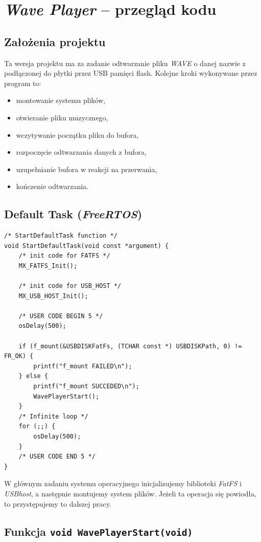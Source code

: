 \documentclass[12pt,a4paper]{article}
\begin{document}
\section{\emph{Wave Player} -- przegląd kodu}

\subsection{Założenia projektu}
Ta wersja projektu ma za zadanie odtwarzanie pliku \emph{WAVE} o danej nazwie z podłączonej do płytki przez USB pamięci flash. Kolejne kroki wykonywane przez program to:
\begin{itemize}
 \item montowanie systemu plików,
 \item otwieranie pliku muzycznego,
 \item wczytywanie początku pliku do bufora,
 \item rozpoczęcie odtwarzania danych z bufora,
 \item uzupełnianie bufora w reakcji na przerwania,
 \item kończenie odtwarzania.
\end{itemize}

\subsection{Default Task (\emph{FreeRTOS})}

\begin{lstlisting}
/* StartDefaultTask function */
void StartDefaultTask(void const *argument) {
    /* init code for FATFS */
    MX_FATFS_Init();

    /* init code for USB_HOST */
    MX_USB_HOST_Init();

    /* USER CODE BEGIN 5 */
    osDelay(500);

    if (f_mount(&USBDISKFatFs, (TCHAR const *) USBDISKPath, 0) != FR_OK) {
        printf("f_mount FAILED\n");
    } else {
        printf("f_mount SUCCEDED\n");
        WavePlayerStart();
    }
    /* Infinite loop */
    for (;;) {
        osDelay(500);
    }
    /* USER CODE END 5 */
}
\end{lstlisting}

W głównym zadaniu systemu operacyjnego inicjalizujemy biblioteki \emph{FatFS} i \emph{USBhost}, a następnie montujemy system plików. Jeżeli ta operacja się powiodła, to przystępujemy to dalszej pracy.

\subsection{Funkcja \texttt{void WavePlayerStart(void)}}
\end{document}

